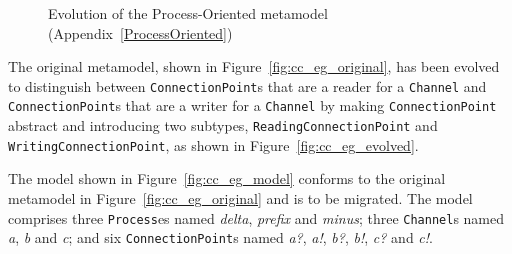 \begin{figure}
	\centering
	\caption[Evolution of the Process-Oriented metamodel]{Evolution of the Process-Oriented metamodel (Appendix~\ref{ProcessOriented})}
\label{fig:cc_eg_mms}
\end{figure}

The original metamodel, shown in Figure~\ref{fig:cc_eg_original}, has been evolved to distinguish between \texttt{Co\-nn\-ec\-ti\-o\-nP\-oi\-nt}s that are a reader for a \texttt{Ch\-an\-n\-el} and \texttt{Co\-nn\-ec\-ti\-o\-nP\-oi\-nt}s that are a writer for a \texttt{Ch\-an\-n\-el} by making \texttt{Co\-nn\-ec\-ti\-o\-nP\-oi\-nt} abstract and introducing two subtypes, \texttt{Re\-a\-di\-ngCo\-nn\-ec\-ti\-o\-nP\-oi\-nt} and \texttt{Wr\-i\-ti\-ngCo\-nn\-ec\-ti\-o\-nP\-oi\-nt}, as shown in Figure~\ref{fig:cc_eg_evolved}.

The model shown in Figure~\ref{fig:cc_eg_model} conforms to the original metamodel in Figure~\ref{fig:cc_eg_original} and is to be migrated. The model comprises three \texttt{Pr\-oc\-e\-ss}es named \emph{delta}, \emph{prefix} and \emph{minus}; three \texttt{Ch\-an\-n\-el}s named \emph{a}, \emph{b} and \emph{c}; and six \texttt{Co\-nn\-ec\-ti\-o\-nP\-oi\-nt}s named \emph{a?}, \emph{a!}, \emph{b?}, \emph{b!}, \emph{c?} and \emph{c!}.


